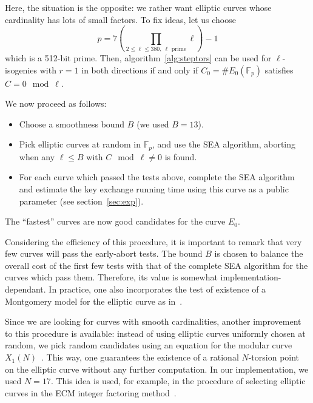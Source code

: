 \documentclass{article}
\newcommand{\F}{\mathbb{F}}
\theoremstyle{definition}
\begin{document}
Here, the situation is the opposite: we rather want elliptic curves
whose cardinality has lots of small factors. To fix ideas, let us choose
\[
p = 7 \left(\prod_{2\leq\ell\leq 380,\ \ell \text{ prime}} \ell\right) - 1
\]
which is a 512-bit prime. Then, algorithm~\ref{alg:steptors} can be used
for $\ell$-isogenies with $r=1$ in both directions if and only if
$C_0 = \# E_0(\F_p)$ satisfies $C=0\mod\ell$.

We now proceed as follows:
\begin{itemize}
\item Choose a smoothness bound $B$ (we used $B = 13$).
\item Pick elliptic curves at random in $\F_p$, and use the SEA
algorithm, aborting when any $\ell\leq B$ with $C\mod\ell\neq 0$
is found.
\item For each curve which passed the tests above, complete the SEA
algorithm and estimate the key exchange running time using this
curve as a public parameter (see section~\ref{sec:exp}).
\end{itemize}
The ``fastest'' curves are now good candidates for the curve $E_0$.

Considering the efficiency of this procedure, it is important to remark
that very few curves will pass the early-abort tests. The bound $B$ is
chosen to balance the overall cost of the first few tests with that of
the complete SEA algorithm for the curves which pass them. Therefore,
its value is somewhat implementation-dependant. In practice, one also
incorporates the test of existence of a Montgomery model for the
elliptic curve as in~\cite{todo:refMontgomery}.

Since we are looking for curves with smooth cardinalities, another
improvement to this procedure is available: instead of using elliptic
curves uniformly chosen at random, we pick random candidates using
an equation for the modular curve $X_1(N)$~\cite{todo:refSutherland}.
This way, one guarantees the existence of a rational $N$-torsion point
on the elliptic curve without any further computation. In our
implementation, we used $N = 17$. This idea is used, for example,
in the procedure of selecting elliptic curves in the ECM integer
factoring method~\cite{todo:refECM}.
\end{document}
